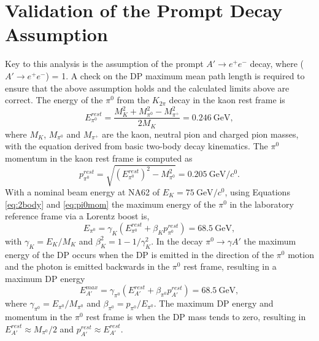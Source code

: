 \documentclass[../../main.tex]{subfiles}
\begin{document}
    \section{Validation of the Prompt Decay Assumption}\label{sec:PromptLim}
    Key to this analysis is the assumption of the prompt $A' \to e^+e^-$ decay, where ($A' \to e^+e^-$) = 1. A check on the \gls{DP} maximum mean path length is required to ensure that the above assumption holds and the calculated limits above are correct. 
    The energy of the $\pi^0$ from the $K_{2\pi}$ decay in the kaon rest frame is
    \begin{equation} \label{eq:2body}
        E_{\pi^0}^{rest} = \frac{M_K^2 + M_{\pi^0}^2 - M_{\pi^+}^2}{2M_K} = \SI{0.246}{\giga\electronvolt},
    \end{equation}
    where $M_K$, $M_{\pi^0}$ and $M_{\pi^+}$ are the kaon, neutral pion and charged pion masses, with the equation derived from basic two-body decay kinematics. The $\pi^0$ momentum in the kaon rest frame is computed as
    \begin{equation} \label{eq:pi0mom}
        p_{\pi^0}^{rest} = \sqrt{(E_{\pi^0}^{rest})^2 - M_{\pi^0}^2} = \SI{0.205}{\giga\electronvolt\per\clight}.
    \end{equation}
    With a nominal beam energy at NA62 of $E_{K} = \SI{75}{\giga\electronvolt\per\clight}$, using Equations \ref{eq:2body} and \ref{eq:pi0mom} the maximum energy of the $\pi^0$ in the laboratory reference frame via a Lorentz boost is,
    \begin{equation}
        E_{\pi^0} = \gamma_K (E_{\pi^0}^{rest} + \beta_K p_{\pi^0}^{rest}) = \SI{68.5}{\giga\electronvolt},
    \end{equation}
    with $\gamma_K = E_{K} / M_K$ and $\beta_K^2 = 1 - 1/\gamma_K^2$. In the decay $\pi^0 \to \gamma A'$ the maximum energy of the \gls{DP} occurs when the \gls{DP} is emitted in the direction of the $\pi^0$ motion and the photon is emitted backwards in the $\pi^0$ rest frame, resulting in a maximum \gls{DP} energy
    \begin{equation}
        E^{max}_{A'} = \gamma_{\pi^0} (E_{A'}^{rest} + \beta_{\pi^0} p_{A'}^{rest}) = \SI{68.5}{\giga\electronvolt},
    \end{equation} 
    where $\gamma_{\pi^0} = E_{\pi^0} / M_{\pi^0}$ and $\beta_{\pi^0} = p_{\pi^0} / E_{\pi^0}$. The maximum \gls{DP} energy and momentum in the $\pi^0$ rest frame is when the \gls{DP} mass tends to zero, resulting in \mbox{$E_{A'}^{rest} \approx M_{\pi^0} / 2$} and \mbox{$p_{A'}^{rest} \approx E_{A'}^{rest}$}.
\end{document}
